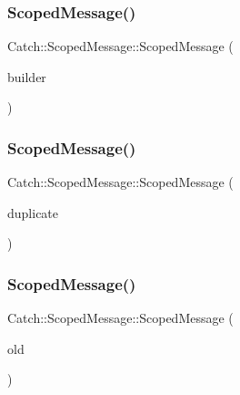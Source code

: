 \subsubsection{\texorpdfstring{ScopedMessage()}{ScopedMessage()}\hspace{0.1cm}{\footnotesize\ttfamily [1/3]}}
{\footnotesize\ttfamily Catch\+::\+Scoped\+Message\+::\+Scoped\+Message (\begin{DoxyParamCaption}\item[{\mbox{\hyperlink{struct_catch_1_1_message_builder}{Message\+Builder}} const \&}]{builder }\end{DoxyParamCaption})\hspace{0.3cm}{\ttfamily [explicit]}}

\mbox{\label{class_catch_1_1_scoped_message_a5fe2e79afdfd737818c15edfc49f378e}} 
\subsubsection{\texorpdfstring{ScopedMessage()}{ScopedMessage()}\hspace{0.1cm}{\footnotesize\ttfamily [2/3]}}
{\footnotesize\ttfamily Catch\+::\+Scoped\+Message\+::\+Scoped\+Message (\begin{DoxyParamCaption}\item[{\mbox{\hyperlink{class_catch_1_1_scoped_message}{Scoped\+Message}} \&}]{duplicate }\end{DoxyParamCaption})\hspace{0.3cm}{\ttfamily [delete]}}

\mbox{\label{class_catch_1_1_scoped_message_aac833a6a2245a26e6bd5c9252ca1caa0}} 
\subsubsection{\texorpdfstring{ScopedMessage()}{ScopedMessage()}\hspace{0.1cm}{\footnotesize\ttfamily [3/3]}}
{\footnotesize\ttfamily Catch\+::\+Scoped\+Message\+::\+Scoped\+Message (\begin{DoxyParamCaption}\item[{\mbox{\hyperlink{class_catch_1_1_scoped_message}{Scoped\+Message}} \&\&}]{old }\end{DoxyParamCaption})}

